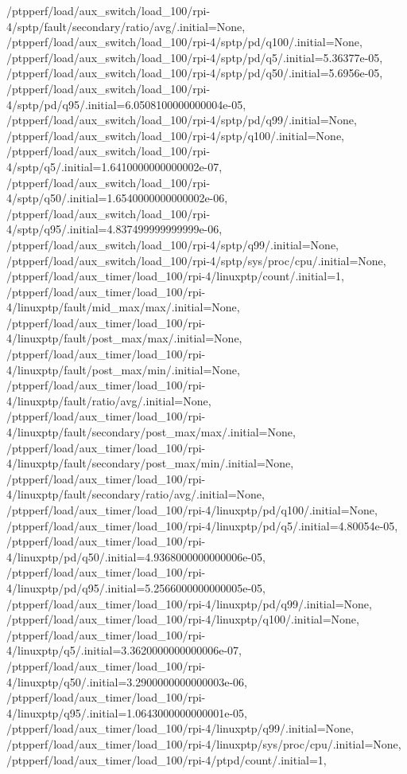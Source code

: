 {    /ptpperf/load/aux_switch/load_100/rpi-4/sptp/fault/secondary/ratio/avg/.initial=None,
    /ptpperf/load/aux_switch/load_100/rpi-4/sptp/pd/q100/.initial=None,
    /ptpperf/load/aux_switch/load_100/rpi-4/sptp/pd/q5/.initial=5.36377e-05,
    /ptpperf/load/aux_switch/load_100/rpi-4/sptp/pd/q50/.initial=5.6956e-05,
    /ptpperf/load/aux_switch/load_100/rpi-4/sptp/pd/q95/.initial=6.0508100000000004e-05,
    /ptpperf/load/aux_switch/load_100/rpi-4/sptp/pd/q99/.initial=None,
    /ptpperf/load/aux_switch/load_100/rpi-4/sptp/q100/.initial=None,
    /ptpperf/load/aux_switch/load_100/rpi-4/sptp/q5/.initial=1.6410000000000002e-07,
    /ptpperf/load/aux_switch/load_100/rpi-4/sptp/q50/.initial=1.6540000000000002e-06,
    /ptpperf/load/aux_switch/load_100/rpi-4/sptp/q95/.initial=4.837499999999999e-06,
    /ptpperf/load/aux_switch/load_100/rpi-4/sptp/q99/.initial=None,
    /ptpperf/load/aux_switch/load_100/rpi-4/sptp/sys/proc/cpu/.initial=None,
    /ptpperf/load/aux_timer/load_100/rpi-4/linuxptp/count/.initial=1,
    /ptpperf/load/aux_timer/load_100/rpi-4/linuxptp/fault/mid_max/max/.initial=None,
    /ptpperf/load/aux_timer/load_100/rpi-4/linuxptp/fault/post_max/max/.initial=None,
    /ptpperf/load/aux_timer/load_100/rpi-4/linuxptp/fault/post_max/min/.initial=None,
    /ptpperf/load/aux_timer/load_100/rpi-4/linuxptp/fault/ratio/avg/.initial=None,
    /ptpperf/load/aux_timer/load_100/rpi-4/linuxptp/fault/secondary/post_max/max/.initial=None,
    /ptpperf/load/aux_timer/load_100/rpi-4/linuxptp/fault/secondary/post_max/min/.initial=None,
    /ptpperf/load/aux_timer/load_100/rpi-4/linuxptp/fault/secondary/ratio/avg/.initial=None,
    /ptpperf/load/aux_timer/load_100/rpi-4/linuxptp/pd/q100/.initial=None,
    /ptpperf/load/aux_timer/load_100/rpi-4/linuxptp/pd/q5/.initial=4.80054e-05,
    /ptpperf/load/aux_timer/load_100/rpi-4/linuxptp/pd/q50/.initial=4.9368000000000006e-05,
    /ptpperf/load/aux_timer/load_100/rpi-4/linuxptp/pd/q95/.initial=5.2566000000000005e-05,
    /ptpperf/load/aux_timer/load_100/rpi-4/linuxptp/pd/q99/.initial=None,
    /ptpperf/load/aux_timer/load_100/rpi-4/linuxptp/q100/.initial=None,
    /ptpperf/load/aux_timer/load_100/rpi-4/linuxptp/q5/.initial=3.3620000000000006e-07,
    /ptpperf/load/aux_timer/load_100/rpi-4/linuxptp/q50/.initial=3.2900000000000003e-06,
    /ptpperf/load/aux_timer/load_100/rpi-4/linuxptp/q95/.initial=1.0643000000000001e-05,
    /ptpperf/load/aux_timer/load_100/rpi-4/linuxptp/q99/.initial=None,
    /ptpperf/load/aux_timer/load_100/rpi-4/linuxptp/sys/proc/cpu/.initial=None,
    /ptpperf/load/aux_timer/load_100/rpi-4/ptpd/count/.initial=1,
}
